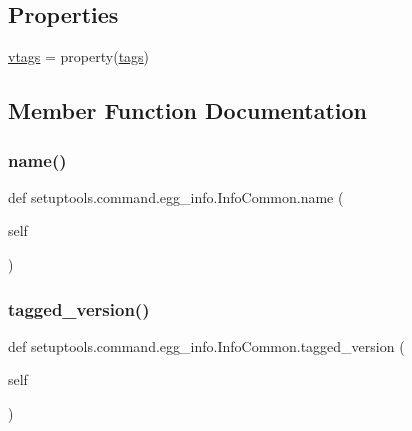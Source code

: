 \subsection*{Properties}
\begin{DoxyCompactItemize}
\item 
\hyperlink{classsetuptools_1_1command_1_1egg__info_1_1InfoCommon_ad699e9f4f9736bf13473c0cd01464648}{vtags} = property(\hyperlink{classsetuptools_1_1command_1_1egg__info_1_1InfoCommon_a9d01045a03a1438d0f9e9e88855fbca0}{tags})
\end{DoxyCompactItemize}


\subsection{Member Function Documentation}
\mbox{\label{classsetuptools_1_1command_1_1egg__info_1_1InfoCommon_a13f1532df6e92fbd8ae68eb480808db2}} 
\subsubsection{\texorpdfstring{name()}{name()}}
{\footnotesize\ttfamily def setuptools.\+command.\+egg\+\_\+info.\+Info\+Common.\+name (\begin{DoxyParamCaption}\item[{}]{self }\end{DoxyParamCaption})}

\mbox{\label{classsetuptools_1_1command_1_1egg__info_1_1InfoCommon_a5b67379d9236639690fdcce6f1884d42}} 
\subsubsection{\texorpdfstring{tagged\+\_\+version()}{tagged\_version()}}
{\footnotesize\ttfamily def setuptools.\+command.\+egg\+\_\+info.\+Info\+Common.\+tagged\+\_\+version (\begin{DoxyParamCaption}\item[{}]{self }\end{DoxyParamCaption})}

